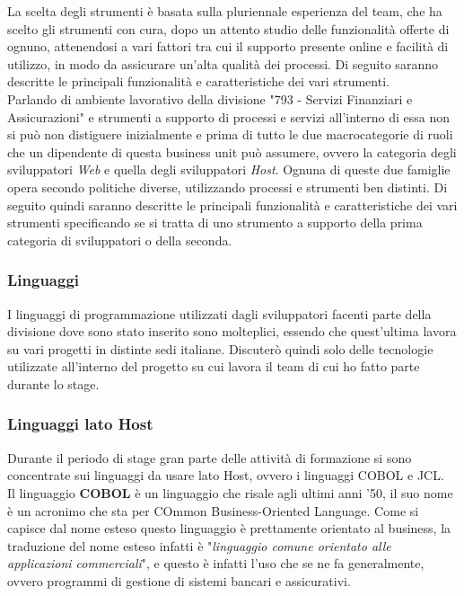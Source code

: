 	La scelta degli strumenti è basata sulla pluriennale esperienza del team, che ha scelto gli strumenti con cura, dopo un attento studio delle funzionalità offerte di ognuno, attenendosi a vari fattori tra cui il supporto presente online e facilità di utilizzo, in modo da assicurare un'alta qualità dei processi. Di seguito saranno descritte le principali funzionalità e caratteristiche dei vari strumenti.\\

	Parlando di ambiente lavorativo della divisione "793 - Servizi Finanziari e Assicurazioni" e strumenti a supporto di processi e servizi all'interno di essa non si può non distiguere inizialmente e prima di tutto le due macrocategorie di ruoli che un dipendente di questa business unit può assumere, ovvero la categoria degli sviluppatori \textit{Web} e quella degli sviluppatori \textit{Host}. Ognuna di queste due famiglie opera secondo politiche diverse, utilizzando processi e strumenti ben distinti. Di seguito quindi saranno descritte le principali funzionalità e caratteristiche dei vari strumenti specificando se si tratta di uno strumento a supporto della prima categoria di sviluppatori o della seconda.
	
	\subsubsection{Linguaggi}
	
	I linguaggi di programmazione utilizzati dagli sviluppatori facenti parte della divisione dove sono stato inserito sono molteplici, essendo che quest'ultima lavora su vari progetti in distinte sedi italiane. Discuterò quindi solo delle tecnologie utilizzate all'interno del progetto su cui lavora il team di cui ho fatto parte durante lo stage.
		
	\subsubsection{Linguaggi lato Host}
	Durante il periodo di stage gran parte delle attività di formazione si sono concentrate sui linguaggi da usare lato Host, ovvero i linguaggi COBOL e JCL.\\
	
	Il linguaggio \textbf{COBOL} è un linguaggio che risale agli ultimi anni '50, il suo nome è un acronimo che sta per COmmon Business-Oriented Language. Come si capisce dal nome esteso questo linguaggio è prettamente orientato al business, la traduzione del nome esteso infatti è "\textit{linguaggio comune orientato alle applicazioni commerciali}", e questo è infatti l'uso che se ne fa generalmente, ovvero programmi di gestione di sistemi bancari e assicurativi.\\

